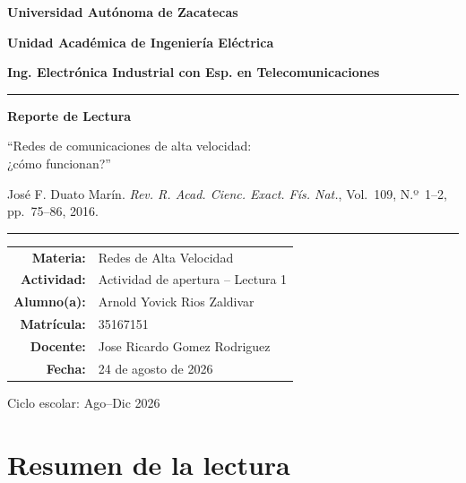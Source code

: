 \documentclass[12pt,a4paper]{article}
\begin{document}
\begin{titlepage}
    \centering
    \vspace*{1cm}
    {\Large\bfseries Universidad Autónoma de Zacatecas\par}
    \vspace{0.4cm}
    {\large\bfseries Unidad Académica de Ingeniería Eléctrica\par}
    {\large\bfseries Ing. Electrónica Industrial con Esp. en Telecomunicaciones\par}
    \vspace{1.5cm}
    \noindent\rule{\textwidth}{0.8pt}
    \vspace{1cm}
    {\huge\bfseries Reporte de Lectura\par}
    \vspace{0.7cm}
    {\Large ``Redes de comunicaciones de alta velocidad: \\ ¿cómo funcionan?''\par}
    \vspace{0.6cm}
    {\normalsize José F. Duato Marín. \textit{Rev. R. Acad. Cienc. Exact. Fís. Nat.}, Vol.~109, N.º~1--2, pp.~75--86, 2016.\par}
    \vspace{1cm}
    \noindent\rule{\textwidth}{0.8pt}
    \vspace{1.8cm}

    \begin{tabular}{r l}
        \textbf{Materia:}    & Redes de Alta Velocidad \\[0.35cm]
        \textbf{Actividad:}  & Actividad de apertura -- Lectura 1 \\[0.35cm]
        \textbf{Alumno(a):}  & Arnold Yovick Rios Zaldivar \\[0.35cm]
        \textbf{Matrícula:}  & 35167151 \\[0.35cm]
        \textbf{Docente:}    & Jose Ricardo Gomez Rodriguez \\[0.35cm]
        \textbf{Fecha:}      & 24 de agosto de 2026
    \end{tabular}

    \vfill
    Ciclo escolar: Ago--Dic 2026
    \vspace*{0.5cm}
\end{titlepage}
\setcounter{page}{1}

\section{Resumen de la lectura}
\end{document}

